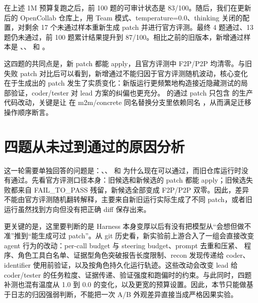 \documentclass[UTF8,a4paper,11pt]{ctexart}
\begin{document}
在上述 1M 预算复跑之后，前 100 题的可审计状态是 83/100。随后，我们在更新后的 OpenCollab 仓库上，用 Team 模式、temperature=0.0、thinking 关闭的配置，对剩余 17 个未通过样本重新生成 patch 并进行官方评测。最终 4 题通过、13 题仍未通过，前 100 题累计结果提升到 87/100。相比之前的旧版本，新增通过样本是 、、 和 。

这四题的共同点是，新 patch 都能 apply，且官方评测中 F2P/P2P 均清零。与旧失败 patch 对比后可以看到，新增通过不能归因于官方评测随机波动，核心变化在于生成出的 patch 发生了实质变化：新版运行更频繁地构造接近隐藏测试的局部验证，coder/tester 对 lead 方案的纠偏也更充分。 的通过 patch 只包含  的生产代码改动，关键是让  在 m2m/concrete 同名替换分支里依赖同名 ，从而满足迁移操作顺序断言。

\section{四题从未过到通过的原因分析}

这一轮需要单独回答的问题是：、、 和  为什么现在可以通过，而旧仓库运行时没有通过。先看官方评测口径本身：旧候选和新候选的 patch 都能 apply；旧候选失败都来自 FAIL\_TO\_PASS 残留，新候选全部变成 F2P/P2P 双零。因此，差异不能由官方评测随机翻转解释，主要来自新旧运行实际生成了不同 patch，或者旧运行虽然找到方向但没有把正确 diff 保存出来。

更关键的是，这里要判断的是 Harness 本身变厚以后有没有把模型从“会想但做不准”推到“能生成可过 patch”。从 git 历史看，新实验前上游合入了一组会直接改变 agent 行为的改动：per-call budget 与 steering budget、prompt 去重和压紧、 程序、角色工具白名单、证据型角色突破报告长度限制、recon 发现传递给 coder、identifier 使用前验证，以及按角色持久化运行轨迹。这些改动会改变 lead 给 coder/tester 的任务粒度、证据传递、验证强度和跑偏时的约束。与此同时，四题补测也混有温度从 1.0 到 0.0 的变化，以及更宽的预算设置。因此，本节只能做基于日志的归因强弱判断，不能把一次 A/B 外观差异直接当成严格因果实验。
\end{document}
